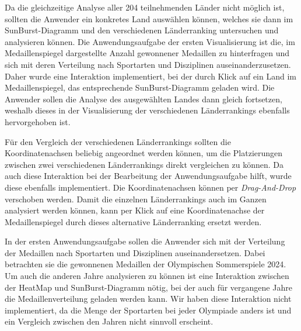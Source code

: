 Da die gleichzeitige Analyse aller 204 teilnehmenden Länder nicht möglich ist, sollten die Anwender ein konkretes Land auswählen können, welches sie dann im SunBurst-Diagramm und den verschiedenen Länderranking untersuchen und analysieren können. Die Anwendungsaufgabe der ersten Visualisierung ist die, im Medaillenspiegel dargestellte Anzahl gewonnener Medaillen zu hinterfragen und sich mit deren Verteilung nach Sportarten und Disziplinen auseinanderzusetzen. Daher wurde eine Interaktion implementiert, bei der durch Klick auf ein Land im Medaillenspiegel, das entsprechende SunBurst-Diagramm geladen wird. Die Anwender sollen die Analyse des ausgewählten Landes dann gleich fortsetzen, weshalb dieses in der Visualisierung der verschiedenen Länderrankings ebenfalls hervorgehoben ist.

Für den Vergleich der verschiedenen Länderrankings sollten die Koordinatenachsen beliebig angeordnet werden können, um die Platzierungen zwischen zwei verschiedenen Länderrankings direkt vergleichen zu können. Da auch diese Interaktion bei der Bearbeitung der Anwendungsaufgabe hilft, wurde diese ebenfalls implementiert. Die Koordinatenachsen können per \textit{Drag-And-Drop} verschoben werden. Damit die einzelnen Länderrankings auch im Ganzen analysiert werden können, kann per Klick auf eine Koordinatenachse der Medaillenspiegel durch dieses alternative Länderranking ersetzt werden.

In der ersten Anwendungsaufgabe sollen die Anwender sich mit der Verteilung der Medaillen nach Sportarten und Disziplinen auseinandersetzen. Dabei betrachten sie die gewonnenen Medaillen der Olympischen Sommerspiele 2024. Um auch die anderen Jahre analysieren zu können ist eine Interaktion zwischen der HeatMap und SunBurst-Diagramm nötig, bei der auch für vergangene Jahre die Medaillenverteilung geladen werden kann. Wir haben diese Interaktion nicht implementiert, da die Menge der Sportarten bei jeder Olympiade anders ist und ein Vergleich zwischen den Jahren nicht sinnvoll erscheint.